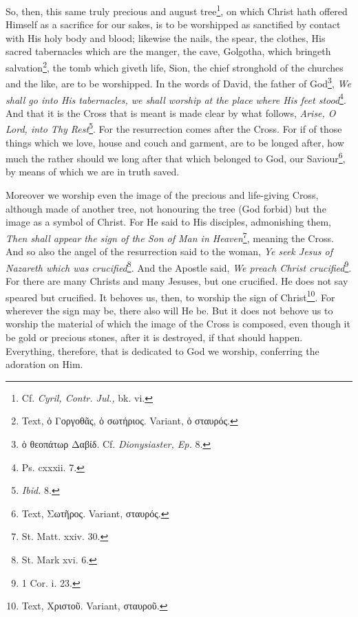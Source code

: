 So, then, this same truly precious and august tree\footnote{Cf. \emph{Cyril, Contr. Jul., }bk. vi.}, on which Christ hath offered Himself as a sacrifice for our sakes, is to be worshipped as sanctified by contact with His holy body and blood; likewise the nails, the spear, the clothes, His sacred tabernacles which are the manger, the cave, Golgotha, which bringeth salvation\footnote{Text, \textgreek{ὁ Γοργοθᾶς, ὁ σωτήριος}. Variant, \textgreek{ὁ σταυρός}.}, the tomb which giveth life, Sion, the chief stronghold of the churches and the like, are to be worshipped. In the words of David, the father of God\footnote{\textgreek{ὁ θεοπάτωρ Δαβίδ}. Cf. \emph{Dionysiaster, Ep. }8.}, \emph{We shall go into His tabernacles, we shall worship at the place where His feet stood}\footnote{Ps. cxxxii. 7.}. And that it is the Cross that is meant is made clear by what follows, \emph{Arise, O Lord, into Thy Rest}\footnote{\emph{Ibid.} 8.}. For the resurrection comes after the Cross. For if of those things which we love, house and couch and garment, are to be longed after, how much the rather should we long after that which belonged to God, our Saviour\footnote{Text, \textgreek{Σωτῆρος}. Variant, \textgreek{σταυρός}.}, by means of which we are in truth saved.

Moreover we worship even the image of the precious and life-giving Cross, although made of another tree, not honouring the tree (God forbid) but the image as a symbol of Christ. For He said to His disciples, admonishing them, \emph{Then shall appear the sign of the Son of Man in Heaven}\footnote{St. Matt. xxiv. 30.}, meaning the Cross. And so also the angel of the resurrection said to the woman, \emph{Ye seek Jesus of Nazareth which was crucified}\footnote{St. Mark xvi. 6.}. And the Apostle said, \emph{We preach Christ crucified}\footnote{1 Cor. i. 23.}. For there are many Christs and many Jesuses, but one crucified. He does not say speared but crucified. It behoves us, then, to worship the sign of Christ\footnote{Text, \textgreek{Χριστοῦ}. Variant, \textgreek{σταυροῦ}.}. For wherever the sign may be, there also will He be. But it does not behove us to worship the material of which the image of the Cross is composed, even though it be gold or precious stones, after it is destroyed, if that should happen. Everything, therefore, that is dedicated to God we worship, conferring the adoration on Him.

